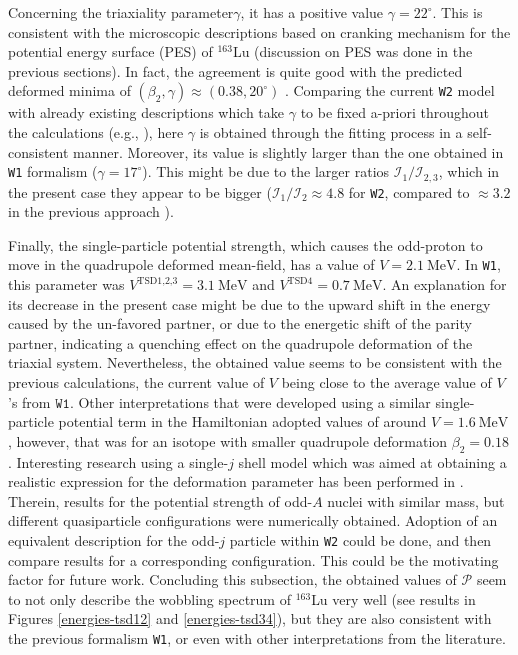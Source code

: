 \documentclass[myclassdoc,debug]{rjparticle}
\begin{document}
Concerning the triaxiality parameter$\gamma$, it has a positive value $\gamma=22^\circ$. This is consistent with the microscopic descriptions based on cranking mechanism for the potential energy surface (PES) of $^{163}$Lu (discussion on PES was done in the previous sections). In fact, the agreement is quite good with the predicted deformed minima of $(\beta_2,\gamma)\approx(0.38,20^\circ)$ \cite{jensen2002wobbling,jensen2004coexisting}. Comparing the current \texttt{W2} model with already existing descriptions which take $\gamma$ to be fixed a-priori throughout the calculations (e.g., \cite{tanabe2006algebraic,tanabe2017stability}), here $\gamma$ is obtained through the fitting process in a self-consistent manner. Moreover, its value is slightly larger than the one obtained in \texttt{W1} formalism ($\gamma=17^\circ$). This might be due to the larger ratios $\mathcal{I}_1/\mathcal{I}_{2,3}$, which in the present case they appear to be bigger ($\mathcal{I}_1/\mathcal{I}_{2}\approx4.8$ for \texttt{W2}, compared to $\approx3.2$ in the previous approach ).

Finally, the single-particle potential strength, which causes the odd-proton to move in the quadrupole deformed mean-field, has a value of $V=2.1\ \text{MeV}$. In \texttt{W1}, this parameter was $V^{\text{TSD1,2,3}}=3.1\ \text{MeV}$ and $V^\text{TSD4}=0.7\ \text{MeV}$. An explanation for its decrease in the present case might be due to the upward shift in the energy caused by the un-favored partner, or due to the energetic shift of the parity partner, indicating a quenching effect on the quadrupole deformation of the triaxial system. Nevertheless, the obtained value seems to be consistent with the previous calculations, the current value of $V$ being close to the average value of $V$'s from $\texttt{W1}$. Other interpretations \cite{tanabe2017stability} that were developed using a similar single-particle potential term in the Hamiltonian adopted values of around $V=1.6\ \text{MeV}$, however, that was for an isotope with smaller quadrupole deformation $\beta_2=0.18$. Interesting research using a single-$j$ shell model which was aimed at obtaining a realistic expression for the deformation parameter has been performed in \cite{shou2009coupling}. Therein, results for the potential strength of odd-$A$ nuclei with similar mass, but different quasiparticle configurations were numerically obtained. Adoption of an equivalent description for the odd-$j$ particle within \texttt{W2} could be done, and then compare results for a corresponding configuration. This could be the motivating factor for future work. Concluding this subsection, the obtained values of $\mathcal{P}$ seem to not only describe the wobbling spectrum of $^{163}$Lu very well (see results in Figures \ref{energies-tsd12} and \ref{energies-tsd34}), but they are also consistent with the previous formalism \texttt{W1}, or even with other interpretations from the literature. 
\end{document}
